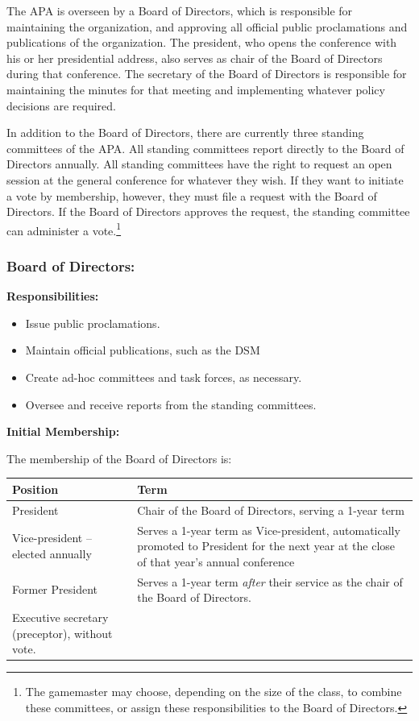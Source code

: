 \begin{refsection}
The APA is overseen by a Board of Directors, which is responsible for maintaining the organization, and approving all official public proclamations and publications of the organization. The president, who opens the conference with his or her presidential address, also serves as chair of the Board of Directors during that conference. The secretary of the Board of Directors is responsible for maintaining the minutes for that meeting and implementing whatever policy decisions are required.

In addition to the Board of Directors, there are currently three standing committees of the APA. All standing committees report directly to the Board of Directors annually. All standing committees have the right to request an open session at the general conference for whatever they wish. If they want to initiate a vote by membership, however, they must file a request with the Board of Directors. If the Board of Directors approves the request, the standing committee can administer a vote.\footnote{The gamemaster may choose, depending on the size of the class, to combine these committees, or assign these responsibilities to the Board of Directors.}

\subsubsection{Board of Directors:}
\label{boardofdirectors:}

\textbf{Responsibilities:}

\begin{itemize}
\item Issue public proclamations.

\item Maintain official publications, such as the DSM

\item Create ad-hoc committees and task forces, as necessary.

\item Oversee and receive reports from the standing committees.

\end{itemize}

\textbf{Initial Membership:}

The membership of the Board of Directors is:

 \begin{longtable}[!t]{ | p{3cm} |  p{10cm} | }
\hline
\textbf{Position}&\textbf{Term} \\ \hline
President&Chair of the Board of Directors, serving a 1-year term \\ \hline
Vice-president – elected annually&Serves a 1-year term as Vice-president, automatically promoted to President for the next year at the close of that year's annual conference \\ \hline
Former President&Serves a 1-year term \emph{after} their service as the chair of the Board of Directors. \\ \hline
Executive secretary (preceptor), without vote.& \\ \hline


\end{longtable}
\end{refsection}
